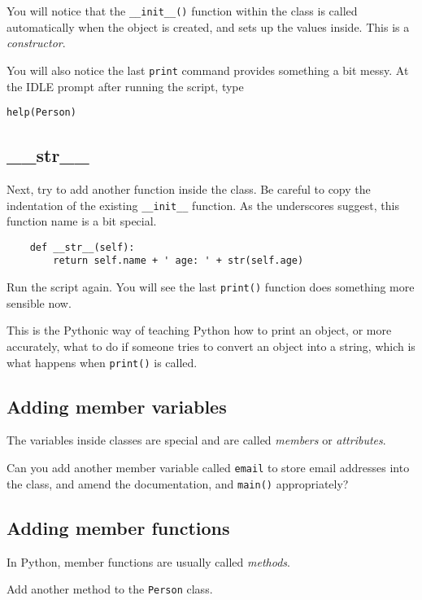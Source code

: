 \documentclass[12pt,oneside]{cttutorial}
\begin{document}
You will notice that the \lstinline!__init__()! function within the class is called automatically when the object is created, and sets up the values inside. This is a \emph{constructor}.

You will also notice the last \lstinline!print! command provides something a bit messy. At the IDLE prompt after running the script, type

\begin{lstlisting}
help(Person)
\end{lstlisting}

\subsection{\_\_str\_\_}

Next, try to add another function inside the class. Be careful to copy the indentation of the existing \lstinline!__init__! function. As the underscores suggest, this function name is a bit special.

\begin{lstlisting}
    def __str__(self):
        return self.name + ' age: ' + str(self.age)
\end{lstlisting}

Run the script again. You will see the last \lstinline!print()! function does something more sensible now.

This is the Pythonic way of teaching Python how to print an object, or more accurately, what to do if someone tries to convert an object into a string, which is what happens when \lstinline!print()! is called.

\subsection{Adding member variables}

The variables inside classes are special and are called \emph{members} or \emph{attributes}.

Can you add another member variable called \lstinline!email! to store email addresses into the class, and amend the documentation, and \lstinline!main()! appropriately?

\subsection{Adding member functions}

In Python, member functions are usually called \emph{methods}.

Add another method to the \lstinline!Person! class.
\end{document}
